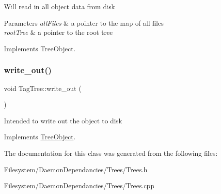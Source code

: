 Will read in all object data from disk 
\begin{DoxyParams}{Parameters}
{\em all\+Files} & a pointer to the map of all files \\
\hline
{\em root\+Tree} & a pointer to the root tree \\
\hline
\end{DoxyParams}


Implements \mbox{\hyperlink{classTreeObject_a722eb00e6782626281afc8eff92840a4}{Tree\+Object}}.

\mbox{\label{classTagTree_adf13e01b25991ecfef1ad958e02c07fe}} 
\subsubsection{\texorpdfstring{write\+\_\+out()}{write\_out()}}
{\footnotesize\ttfamily void Tag\+Tree\+::write\+\_\+out (\begin{DoxyParamCaption}{ }\end{DoxyParamCaption})\hspace{0.3cm}{\ttfamily [virtual]}}

Intended to write out the object to disk 

Implements \mbox{\hyperlink{classTreeObject_a63708d61353d83e3e03597394bb7aca0}{Tree\+Object}}.



The documentation for this class was generated from the following files\+:\begin{DoxyCompactItemize}
\item 
Filesystem/\+Daemon\+Dependancies/\+Trees/Trees.\+h\item 
Filesystem/\+Daemon\+Dependancies/\+Trees/Trees.\+cpp\end{DoxyCompactItemize}
